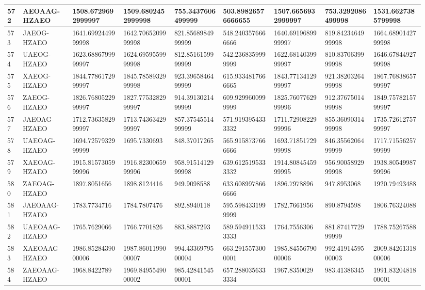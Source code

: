 {\begin{longtable}{|l|l|l|l|l|l|l|l|l|}
        572 & AEOAAG-HZAEO & 1508.6729692999997 & 1509.6802452999998 & 755.3437606499999 & 503.89826576666655 & 1507.6656932999997 & 753.3292086499998 & 1531.6627385799998 \\ \hline
        573 & JAEOG-HZAEO & 1641.6992449999998 & 1642.7065209999998 & 821.8568984999999 & 548.2403576666666 & 1640.6919689999997 & 819.8423464999998 & 1664.6890142799998 \\ \hline
        574 & UAEOG-HZAEO & 1623.6886799999997 & 1624.6959559999998 & 812.8516159999999 & 542.2368359999999 & 1622.6814039999997 & 810.8370639999998 & 1646.6784492799998 \\ \hline
        575 & XAEOG-HZAEO & 1844.7786172999997 & 1845.7858932999998 & 923.3965846499999 & 615.9334817666665 & 1843.7713412999997 & 921.3820326499998 & 1867.7683865799997 \\ \hline
        576 & ZAEOG-HZAEO & 1826.7680522999997 & 1827.7753282999997 & 914.3913021499999 & 609.9299600999999 & 1825.7607762999996 & 912.3767501499998 & 1849.7578215799997 \\ \hline
        577 & JAEOAG-HZAEO & 1712.7363582999997 & 1713.7436342999997 & 857.3754551499999 & 571.9193954333332 & 1711.7290822999996 & 855.3609031499998 & 1735.7261275799997 \\ \hline
        578 & UAEOAG-HZAEO & 1694.7257932999999 & 1695.7330693 & 848.37017265 & 565.9158737666666 & 1693.7185172999998 & 846.3556206499999 & 1717.7155625799999 \\ \hline
        579 & XAEOAG-HZAEO & 1915.8157305999996 & 1916.8230065999996 & 958.9151412999998 & 639.6125195333332 & 1914.8084545999995 & 956.9005892999998 & 1938.8054998799996 \\ \hline
        580 & ZAEOAG-HZAEO & 1897.8051656 & 1898.8124416 & 949.9098588 & 633.6089978666666 & 1896.7978896 & 947.8953068 & 1920.79493488 \\ \hline
        581 & JAEOAAG-HZAEO & 1783.7734716 & 1784.7807476 & 892.8940118 & 595.5984331999999 & 1782.7661956 & 890.8794598 & 1806.76324088 \\ \hline
        582 & UAEOAAG-HZAEO & 1765.7629066 & 1766.7701826 & 883.8887293 & 589.5949115333333 & 1764.7556306 & 881.8741772999999 & 1788.75267588 \\ \hline
        583 & XAEOAAG-HZAEO & 1986.8528439000006 & 1987.8601199000007 & 994.4336979500004 & 663.2915573000001 & 1985.8455679000006 & 992.4191459500003 & 2009.8426131800006 \\ \hline
        584 & ZAEOAAG-HZAEO & 1968.8422789 & 1969.8495549000002 & 985.4284154500001 & 657.2880356333334 & 1967.8350029 & 983.41386345 & 1991.8320481800001 \\ \hline

\end{longtable}}
